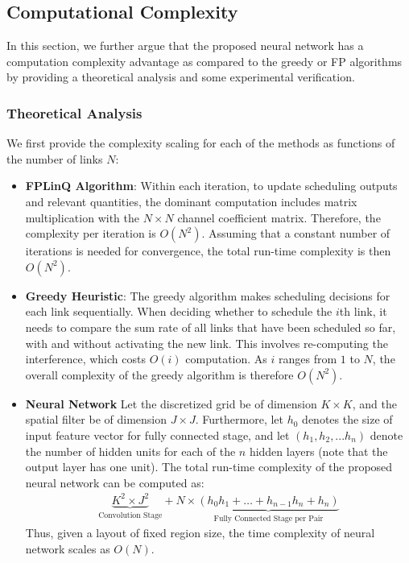 \documentclass[journal,12pt,onecolumn,draftclsnofoot,]{IEEEtran}
\begin{document}
\subsection{Computational Complexity}

In this section, we further argue that the proposed neural network has a
computation complexity advantage as compared to the greedy or FP algorithms by
providing a theoretical analysis and some experimental verification. 

\subsubsection{Theoretical Analysis}
We first provide the complexity scaling for each of the methods as functions of
the number of links $N$:
\begin{itemize}
	\item \textbf{FPLinQ Algorithm}:
    	Within each iteration, to update scheduling outputs and relevant quantities, the dominant computation includes matrix multiplication with the $N\times N$ channel coefficient matrix. Therefore, the complexity per iteration is $O(N^2)$. Assuming that a constant number of iterations is needed for convergence, the total run-time complexity is then $O(N^2)$.
   \item \textbf{Greedy Heuristic}: The greedy algorithm makes scheduling decisions for each link sequentially. When deciding whether to schedule the $i$th link, it needs to compare the sum rate of all links that have been scheduled so far, with and without activating the new link. This involves re-computing the interference, which costs $O(i)$ computation. As $i$ ranges from $1$ to $N$, the overall complexity of the greedy algorithm is therefore $O(N^2)$.
	\item \textbf{Neural Network} Let the discretized grid be of dimension $K\times K$, and the spatial filter be of dimension $J\times J$. Furthermore, let $h_0$ denotes the size of input feature vector for fully connected stage, and let $(h_1, h_2,...h_n)$ denote the number of hidden units for each of the $n$ hidden layers (note that the output layer has one unit). The total run-time complexity of the proposed neural network can be computed as:
\begin{align}
\underbrace{K^2 \times J^2}_{\text{Convolution Stage}} + N \times
\underbrace{(h_0h_1 + \dots + h_{n-1}h_{n} + h_{n})}_{\text{Fully Connected Stage per Pair}}
\end{align}
Thus, given a layout of fixed region size, the time complexity of neural
network scales as $O(N)$. 
\end{itemize} 
\end{document}
